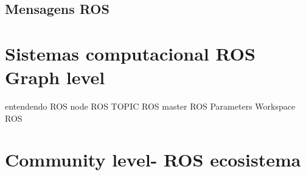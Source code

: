 \subsection{Mensagens ROS}


\section{Sistemas computacional ROS Graph level}
entendendo ROS node
ROS TOPIC
ROS master
ROS Parameters
Workspace ROS


\section{Community level- ROS ecosistema}
















